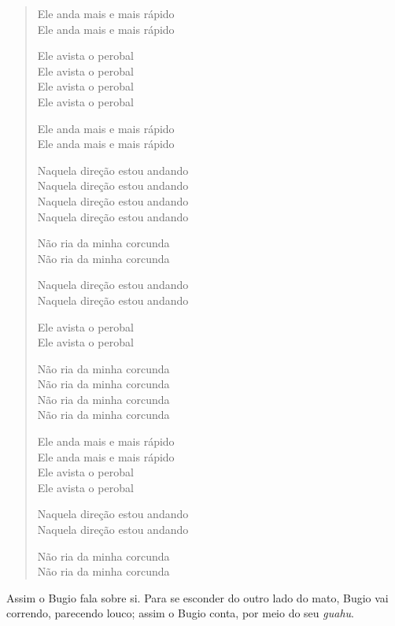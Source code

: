 \begin{verse}
Ele anda mais e mais rápido\footnotemark{}\\
Ele anda mais e mais rápido

Ele avista o perobal\footnotemark{}\\
Ele avista o perobal\\
Ele avista o perobal\\
Ele avista o perobal

Ele anda mais e mais rápido\\
Ele anda mais e mais rápido

Naquela direção estou andando\\
Naquela direção estou andando\\
Naquela direção estou andando\\
Naquela direção estou andando

Não ria da minha corcunda\\
Não ria da minha corcunda

Naquela direção estou andando\\
Naquela direção estou andando

Ele avista o perobal\\
Ele avista o perobal

Não ria da minha corcunda\\
Não ria da minha corcunda\\
Não ria da minha corcunda\\
Não ria da minha corcunda	

Ele anda mais e mais rápido\\
Ele anda mais e mais rápido\\
Ele avista o perobal\\
Ele avista o perobal

Naquela direção estou andando\\
Naquela direção estou andando

Não ria da minha corcunda\\
Não ria da minha corcunda
\end{verse}

Assim o Bugio fala sobre si. Para se esconder do outro lado do mato,
Bugio vai correndo, parecendo louco; assim o Bugio conta, por meio do
seu \textit{guahu}.



